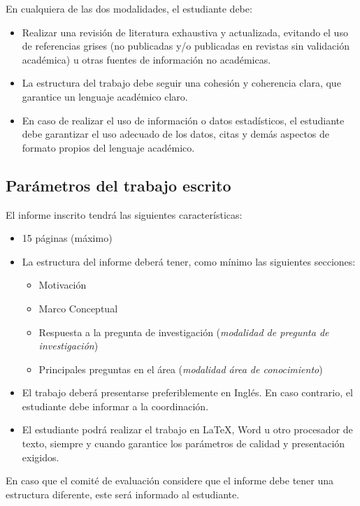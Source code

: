 En cualquiera de las dos modalidades, el estudiante debe:

\begin{itemize}
    \item Realizar una revisión de literatura exhaustiva y actualizada, evitando el uso de referencias grises (no publicadas y/o publicadas en revistas sin validación académica) u otras fuentes de información no académicas.
    \item La estructura del trabajo debe seguir una cohesión y coherencia clara, que garantice un lenguaje académico claro.
    \item En caso de realizar el uso de información o datos estadísticos, el estudiante debe garantizar el uso adecuado de los datos, citas y demás aspectos de formato propios del lenguaje académico.
\end{itemize}

\subsection{Parámetros del trabajo escrito}

El informe inscrito tendrá las siguientes características:
\begin{itemize}
    \item 15 páginas (máximo)
    \item La estructura del informe deberá tener, como mínimo las siguientes secciones:
    \begin{itemize}
        \item Motivación
        \item Marco Conceptual
        \item Respuesta a la pregunta de investigación (\emph{modalidad de pregunta de investigación})
        \item Principales preguntas en el área (\emph{modalidad área de conocimiento})
    \end{itemize}
    \item El trabajo deberá presentarse preferiblemente en Inglés. En caso contrario, el estudiante debe informar a la coordinación.
    \item El estudiante podrá realizar el trabajo en \LaTeX, Word u otro procesador de texto, siempre y cuando garantice los parámetros de calidad y presentación exigidos.
\end{itemize}

En caso que el comité de evaluación considere que el informe debe tener una estructura diferente, este será informado al estudiante. 

